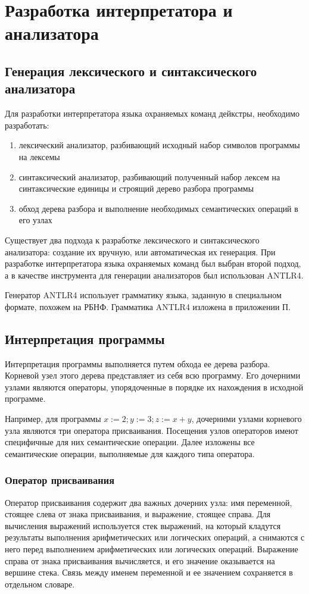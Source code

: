 \chapter{Разработка интерпретатора и анализатора} \label{ch3}

\section{Генерация лексического и синтаксического анализатора}
Для разработки интерпретатора языка охраняемых команд дейкстры, необходимо разработать:
\begin{enumerate}
    \item лексический анализатор, разбивающий исходный набор символов программы на лексемы
    \item синтаксический анализатор, разбивающий полученный набор лексем на синтаксические единицы и строящий
    дерево разбора программы
    \item обход дерева разбора и выполнение необходимых семантических операций в его узлах
\end{enumerate}

Существует два подхода к разработке лексического и синтаксического анализатора: создание их вручную,
или автоматическая их генерация. При разработке интерпретатора языка охраняемых команд был выбран второй подход,
а в качестве инструмента для генерации анализаторов был использован ANTLR4.

Генератор ANTLR4 использует грамматику языка, заданную в специальном формате, похожем на РБНФ.
Грамматика ANTLR4 изложена в приложении П. 

\section{Интерпретация программы}
Интерпретация программы выполняется путем обхода ее дерева разбора. Корневой узел этого дерева
представляет из себя всю программу. Его дочерними узлами являются операторы, упорядоченные 
в порядке их нахождения в исходной программе.

Например, для программы $x := 2; y := 3; z := x + y$, 
дочерними узлами корневого узла являются три оператора присваивания.
Посещения узлов операторов имеют специфичные для них семантические операции. Далее изложены все семантические операции,
выполняемые для каждого типа оператора.

\subsection{Оператор присваивания}
Оператор присваивания содержит два важных дочерних узла: имя переменной, стоящее слева от знака присваивания,
и выражение, стоящее справа. Для вычисления выражений используется стек выражений, на который кладутся результаты
выполнения арифметических или логических операций, а снимаются с него перед выполнением арифметических или логических операций.
Выражение справа от знака присваивания вычисляется, и его значение оказывается на вершине стека.
Связь между именем переменной и ее значением сохраняется в отдельном словаре.

